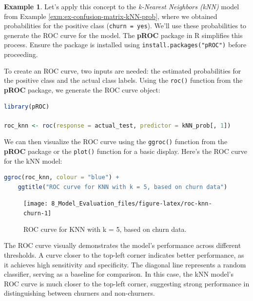 \documentclass[
  11pt,
]{book}
\newcommand{\passthrough}[1]{#1}
\theoremstyle{definition}
\theoremstyle{definition}
\newtheorem{example}{Example}[chapter]
\theoremstyle{definition}
\theoremstyle{definition}
\theoremstyle{remark}
\begin{document}
\begin{example}
\protect\hypertarget{exm:ex-roc-curve-kNN}{}\label{exm:ex-roc-curve-kNN}Let's apply this concept to the \emph{k-Nearest Neighbors (kNN)} model from Example \ref{exm:ex-confusion-matrix-kNN-prob}, where we obtained probabilities for the positive class (\passthrough{\lstinline!churn = yes!}). We'll use these probabilities to generate the ROC curve for the model. The \textbf{pROC} package in R simplifies this process. Ensure the package is installed using \passthrough{\lstinline!install.packages("pROC")!} before proceeding.

To create an ROC curve, two inputs are needed: the estimated probabilities for the positive class and the actual class labels. Using the \passthrough{\lstinline!roc()!} function from the \textbf{pROC} package, we generate the ROC curve object:

\begin{lstlisting}[language=R]
library(pROC)

roc_knn <- roc(response = actual_test, predictor = kNN_prob[, 1])
\end{lstlisting}

We can then visualize the ROC curve using the \passthrough{\lstinline!ggroc()!} function from the \textbf{pROC} package or the \passthrough{\lstinline!plot()!} function for a basic display. Here's the ROC curve for the kNN model:

\begin{lstlisting}[language=R]
ggroc(roc_knn, colour = "blue") +
    ggtitle("ROC curve for KNN with k = 5, based on churn data")
\end{lstlisting}

\begin{figure}[H]

{\centering \texttt{[image: 8\_Model\_Evaluation\_files/figure-latex/roc-knn-churn-1]} 

}

\caption{ROC curve for KNN with k = 5, based on churn data.}\label{fig:roc-knn-churn}
\end{figure}

The ROC curve visually demonstrates the model's performance across different thresholds. A curve closer to the top-left corner indicates better performance, as it achieves high sensitivity and specificity. The diagonal line represents a random classifier, serving as a baseline for comparison. In this case, the kNN model's ROC curve is much closer to the top-left corner, suggesting strong performance in distinguishing between churners and non-churners.
\end{example}
\end{document}
